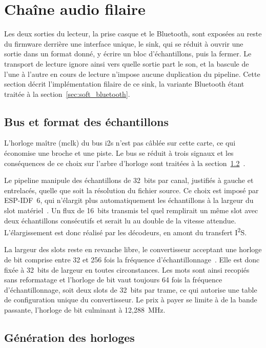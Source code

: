 \section{Chaîne audio filaire}
\label{sec:audio_filaire}

Les deux sorties du lecteur, la prise casque et le Bluetooth, sont exposées au reste du firmware derrière une interface unique, le \gls{sink}, qui se réduit à ouvrir une sortie dans un format donné, y écrire un bloc d'échantillons, puis la fermer. Le transport de lecture ignore ainsi vers quelle sortie part le son, et la bascule de l'une à l'autre en cours de lecture n'impose aucune duplication du pipeline. Cette section décrit l'implémentation filaire de ce sink, la variante Bluetooth étant traitée à la section~\ref{sec:soft_bluetooth}.

\subsection{Bus et format des échantillons}

L'horloge maître (\gls{mclk}) du bus \gls{i2s} n'est pas câblée sur cette carte, ce qui économise une broche et une piste. Le bus se réduit à trois signaux et les conséquences de ce choix sur l'arbre d'horloge sont traitées à la section~\ref{sec:horloges_dac}~\cite{TI_PCM5242}.

Le pipeline manipule des échantillons de 32~bits par canal, justifiés à gauche et entrelacés, quelle que soit la résolution du fichier source. Ce choix est imposé par ESP-IDF~6, qui n'élargit plus automatiquement les échantillons à la largeur du \gls{slot} matériel~\cite{ESP32_IDF_migration_v6}. Un flux de 16~bits transmis tel quel remplirait un même slot avec deux échantillons consécutifs et serait lu au double de la vitesse attendue. L'élargissement est donc réalisé par les décodeurs, en amont du transfert I\textsuperscript{2}S.

La largeur des slots reste en revanche libre, le convertisseur acceptant une horloge de bit comprise entre 32 et 256 fois la fréquence d'échantillonnage~\cite{TI_PCM5242}. Elle est donc fixée à 32~bits de largeur en toutes circonstances. Les mots sont ainsi recopiés sans reformatage et l'horloge de bit vaut toujours 64 fois la fréquence d'échantillonnage, soit deux slots de 32~bits par trame, ce qui autorise une table de configuration unique du convertisseur. Le prix à payer se limite à de la bande passante, l'horloge de bit culminant à 12,288~MHz.

\subsection{Génération des horloges}
\label{sec:horloges_dac}

